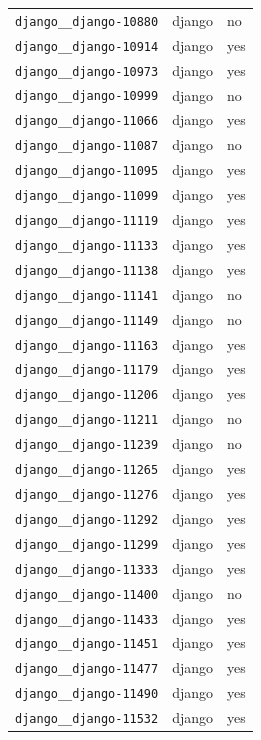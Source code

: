 \begin{longtable}{@{}p{}lp{}@{}}
\texttt{django\_\_django-10880} & django & no \\
\texttt{django\_\_django-10914} & django & yes \\
\texttt{django\_\_django-10973} & django & yes \\
\texttt{django\_\_django-10999} & django & no \\
\texttt{django\_\_django-11066} & django & yes \\
\texttt{django\_\_django-11087} & django & no \\
\texttt{django\_\_django-11095} & django & yes \\
\texttt{django\_\_django-11099} & django & yes \\
\texttt{django\_\_django-11119} & django & yes \\
\texttt{django\_\_django-11133} & django & yes \\
\texttt{django\_\_django-11138} & django & yes \\
\texttt{django\_\_django-11141} & django & no \\
\texttt{django\_\_django-11149} & django & no \\
\texttt{django\_\_django-11163} & django & yes \\
\texttt{django\_\_django-11179} & django & yes \\
\texttt{django\_\_django-11206} & django & yes \\
\texttt{django\_\_django-11211} & django & no \\
\texttt{django\_\_django-11239} & django & no \\
\texttt{django\_\_django-11265} & django & yes \\
\texttt{django\_\_django-11276} & django & yes \\
\texttt{django\_\_django-11292} & django & yes \\
\texttt{django\_\_django-11299} & django & yes \\
\texttt{django\_\_django-11333} & django & yes \\
\texttt{django\_\_django-11400} & django & no \\
\texttt{django\_\_django-11433} & django & yes \\
\texttt{django\_\_django-11451} & django & yes \\
\texttt{django\_\_django-11477} & django & yes \\
\texttt{django\_\_django-11490} & django & yes \\
\texttt{django\_\_django-11532} & django & yes \\

\end{longtable}
